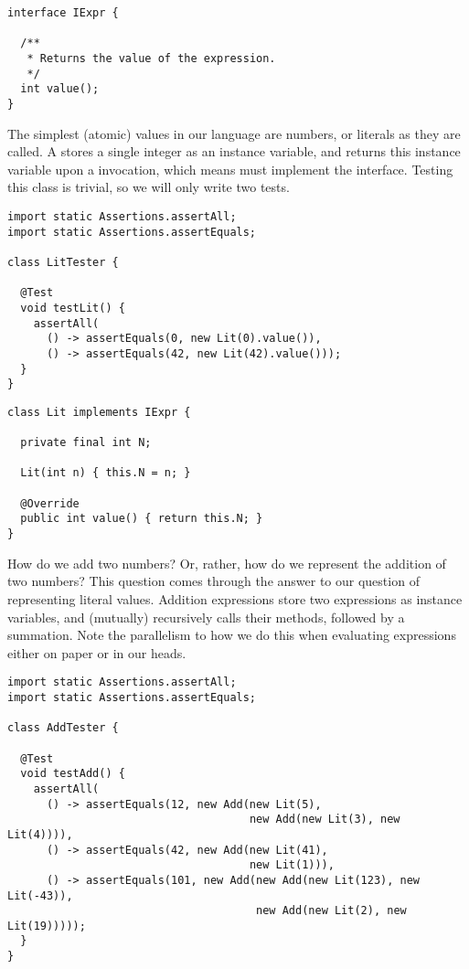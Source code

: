 \begin{lstlisting}[language=MyJava]
interface IExpr {

  /**
   * Returns the value of the expression.
   */
  int value();
}
\end{lstlisting}

The simplest (atomic) values in our language are numbers, or literals as they are called. A  stores a single integer as an instance variable, and returns this instance variable upon a  invocation, which means  must implement the  interface. Testing this class is trivial, so we will only write two tests.

\begin{lstlisting}[language=MyJava]
import static Assertions.assertAll;
import static Assertions.assertEquals;

class LitTester {

  @Test
  void testLit() {
    assertAll(
      () -> assertEquals(0, new Lit(0).value()),      
      () -> assertEquals(42, new Lit(42).value()));
  }
}
\end{lstlisting}

\begin{lstlisting}[language=MyJava]
class Lit implements IExpr {

  private final int N;

  Lit(int n) { this.N = n; }

  @Override
  public int value() { return this.N; }
}
\end{lstlisting}

How do we add two numbers? Or, rather, how do we represent the addition of two numbers? This question comes through the answer to our question of representing literal values. Addition expressions store two  expressions as instance variables, and (mutually) recursively calls their  methods, followed by a summation. Note the parallelism to how we do this when evaluating expressions either on paper or in our heads.

\begin{lstlisting}[language=MyJava]
import static Assertions.assertAll;
import static Assertions.assertEquals;

class AddTester {

  @Test
  void testAdd() {
    assertAll(
      () -> assertEquals(12, new Add(new Lit(5), 
                                     new Add(new Lit(3), new Lit(4)))),
      () -> assertEquals(42, new Add(new Lit(41), 
                                     new Lit(1))),
      () -> assertEquals(101, new Add(new Add(new Lit(123), new Lit(-43)),
                                      new Add(new Lit(2), new Lit(19)))));
  }
}
\end{lstlisting}

